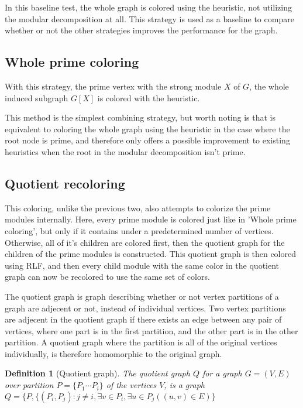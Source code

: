 \documentclass{amsart}
\newtheorem{definition}{Definition}[section]
\begin{document}
In this baseline test, the whole graph is colored using the heuristic, not
utilizing the modular decomposition at all. This strategy is used as a baseline
to compare whether or not the other strategies improves the performance for the
graph.

\subsection{Whole prime coloring}

With this strategy, the prime vertex with the strong module $X$ of $G$, the
whole induced subgraph $G[X]$ is colored with the heuristic.

This method is the simplest combining strategy, but worth noting is that is
equivalent to coloring the whole graph using the heuristic in the case where the
root node is prime, and therefore only offers a possible improvement to existing
heuristics when the root in the modular decomposition isn't prime.

\subsection{Quotient recoloring}

This coloring, unlike the previous two, also attempts to colorize the prime
modules internally. Here, every prime module is colored just like in 'Whole
prime coloring', but only if it contains under a predetermined number of
vertices. Otherwise, all of it's children are colored first, then the quotient
graph for the children of the prime modules is constructed. This quotient graph
is then colored using RLF, and then every child module with the same
color in the quotient graph can now be recolored to use the same set of colors.

The quotient graph is graph describing whether or not vertex partitions of a
graph are adjecent or not, instead of individual vertices. Two vertex
partitions are adjecent in the quotient graph if there exists an edge between
any pair of vertices, where one part is in the first partition, and the other
part is in the other partition. A quotient graph where the partition is all of
the original vertices individually, is therefore homomorphic to the original
graph.

\begin{definition}[Quotient graph]
    The quotient graph $Q$ for a graph $G = (V,E)$ over partition 
    $P = \{P_1 \cdots P_i\}$  of the vertices $V$, is a graph 
    $Q = \{P, \{(P_i,P_j) : j\neq i, \exists v \in P_i,\exists u \in P_j( (u,v)
    \in E)   \}   $
\end{definition}
\end{document}
